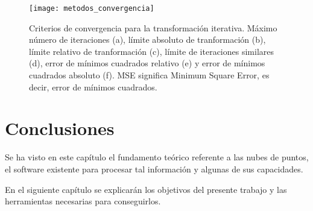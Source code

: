 \begin{figure}
\centering
\texttt{[image: metodos\_convergencia]}
\caption{Criterios de convergencia para la transformación iterativa. Máximo número de iteraciones (a), límite absoluto de tranformación (b), límite relativo de tranformación (c), límite de iteraciones similares (d), error de mínimos cuadrados relativo (e) y error de mínimos cuadrados absoluto (f). MSE significa Minimum Square Error, es decir, error de mínimos cuadrados.}\label{fig:metodos_convergencia}
\end{figure}


\section{Conclusiones}
Se ha visto en este capítulo el fundamento teórico referente a las nubes de puntos, el software existente para procesar tal información y algunas de sus capacidades.

En el siguiente capítulo se explicarán los objetivos del presente trabajo y las herramientas necesarias para conseguirlos.






